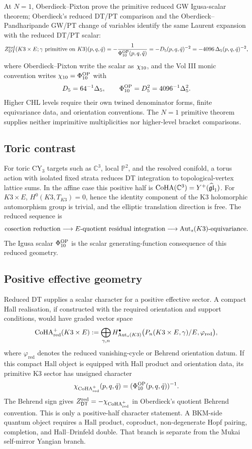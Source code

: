 At \(N=1\), Oberdieck--Pixton prove the primitive reduced GW
Igusa-scalar theorem; Oberdieck's reduced DT/PT comparison and the
Oberdieck--Pandharipande GW/PT change of variables identify the same
Laurent expansion with the reduced DT/PT scalar:
\[
  Z^{\mathrm{red}}_{\mathrm{DT}}
  (K3\times E;\gamma\ \mathrm{primitive\ on\ }K3)(p,q,\tilde q)
  =
  -\frac{1}{\Phi_{10}^{\mathrm{OP}}(p,q,\tilde q)}
  =
  -D_5(p,q,\tilde q)^{-2}
  =
  -4096\,\Delta_5(p,q,\tilde q)^{-2},
\]
where Oberdieck--Pixton write the scalar as \(\chi_{10}\), and the Vol III
monic convention writes \(\chi_{10}=\Phi_{10}^{\mathrm{OP}}\) with
\[
  D_5=64^{-1}\Delta_5,
  \qquad
  \Phi_{10}^{\mathrm{OP}}=D_5^2=4096^{-1}\Delta_5^2.
\]
Higher CHL levels require their own twined denominator forms, finite
equivariance data, and orientation conventions.  The \(N=1\) primitive
theorem supplies neither imprimitive multiplicities nor higher-level
bracket comparisons.

\subsection*{Toric contrast}

For toric CY$_3$ targets such as \(\mathbb C^3\), local
\(\mathbb P^2\), and the resolved conifold, a torus action with isolated
fixed strata reduces DT integration to topological-vertex lattice sums.
In the affine case this positive half is
\(\mathrm{CoHA}(\mathbb C^3)=Y^+(\widehat{\mathfrak{gl}}_1)\).
For \(K3\times E\), \(H^0(K3,T_{K3})=0\), hence the identity component
of the K3 holomorphic automorphism group is trivial, and the elliptic
translation direction is free.  The reduced sequence is
\[
  \mathrm{cosection\ reduction}
  \longrightarrow
  E\text{-quotient residual integration}
  \longrightarrow
  \mathrm{Aut}_{s}(K3)\text{-equivariance}.
\]
The Igusa scalar \(\Phi_{10}^{\mathrm{OP}}\) is the scalar generating-function
consequence of this reduced geometry.

\subsection*{Positive effective geometry}

Reduced DT supplies a scalar character for a positive effective sector.
A compact Hall realisation, if constructed with the required orientation
and support conditions, would have graded vector space
\[
  \mathrm{CoHA}^{+}_{\mathrm{red}}(K3\times E)
  :=
  \bigoplus_{\gamma,n}
  H^{\bullet}_{\mathrm{Aut}_{s}(K3)}
    \bigl(P_n(K3\times E,\gamma)/E,\varphi_{\mathrm{red}}\bigr),
\]
where \(\varphi_{\mathrm{red}}\) denotes the reduced vanishing-cycle or
Behrend orientation datum.  If this compact Hall object is equipped with
Hall product and orientation data, its primitive K3 sector has unsigned
character
\[
  \chi_{\mathrm{CoHA}^{+}_{\mathrm{red}}}(p,q,\tilde q)
  =
  (\Phi_{10}^{\mathrm{OP}}(p,q,\tilde q))^{-1}.
\]
The Behrend sign gives
\(Z^{\mathrm{red}}_{\mathsf{DT}}=-\chi_{\mathrm{CoHA}^{+}_{\mathrm{red}}}\) in Oberdieck's quotient
Behrend convention.  This is only a positive-half character statement.
A BKM-side quantum object requires a
Hall product, coproduct, non-degenerate Hopf pairing, completion, and
Hall--Drinfeld double.  That branch is separate from the Mukai
self-mirror Yangian branch.


